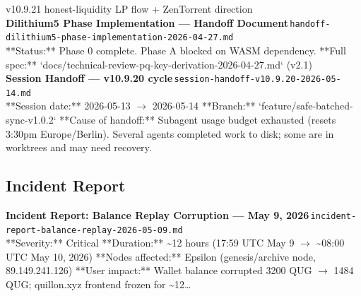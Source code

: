 \documentclass[11pt,a4paper]{article}
\begin{document}
v10.9.21 honest-liquidity LP flow + ZenTorrent direction\\[6pt]
\noindent\textbf{Dilithium5 Phase Implementation --- Handoff Document}\,\textcolor{qgray}{\small \texttt{handoff-dilithium5-phase-implementation-2026-04-27.md}}\\
**Status:** Phase 0 complete. Phase A blocked on WASM dependency. **Full spec:** `docs/technical-review-pq-key-derivation-2026-04-27.md` (v2.1)\\[6pt]
\noindent\textbf{Session Handoff --- v10.9.20 cycle}\,\textcolor{qgray}{\small \texttt{session-handoff-v10.9.20-2026-05-14.md}}\\
**Session date:** 2026-05-13 $\rightarrow$ 2026-05-14 **Branch:** `feature/safe-batched-sync-v1.0.2` **Cause of handoff:** Subagent usage budget exhausted (resets 3:30pm Europe/Berlin). Several agents completed work to disk; some are in worktrees and may need recovery.\\[6pt]
\subsection*{Incident Report}
\noindent\textbf{Incident Report: Balance Replay Corruption --- May 9, 2026}\,\textcolor{qgray}{\small \texttt{incident-report-balance-replay-2026-05-09.md}}\\
**Severity:** Critical **Duration:** \textasciitilde{}12 hours (17:59 UTC May 9 $\rightarrow$ \textasciitilde{}08:00 UTC May 10, 2026) **Nodes affected:** Epsilon (genesis/archive node, 89.149.241.126) **User impact:** Wallet balance corrupted 3200 QUG $\rightarrow$ 1484 QUG; quillon.xyz frontend frozen for \textasciitilde{}12\ldots{}\\[6pt]
\end{document}
